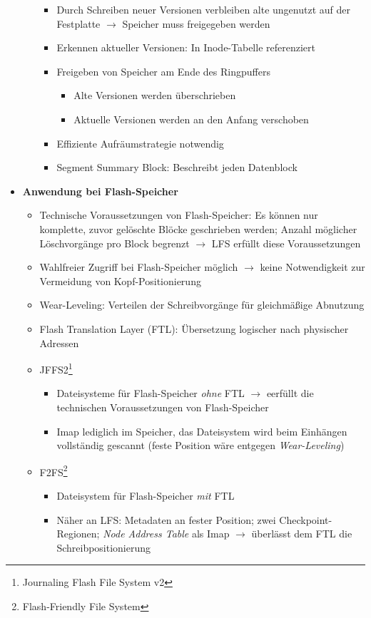 \begin{itemize}
\begin{itemize}
\begin{itemize}
			\item Durch Schreiben neuer Versionen verbleiben alte ungenutzt auf der Festplatte \(\rightarrow\) Speicher muss freigegeben werden
			\item Erkennen aktueller Versionen: In Inode-Tabelle referenziert
			\item Freigeben von Speicher am Ende des Ringpuffers
			\begin{itemize}
				\item Alte Versionen werden überschrieben
				\item Aktuelle Versionen werden an den Anfang verschoben
			\end{itemize}
			\item Effiziente Aufräumstrategie notwendig
			\item Segment Summary Block: Beschreibt jeden Datenblock
		\end{itemize}
	\end{itemize}
	\item \textbf{Anwendung bei Flash-Speicher}
	\begin{itemize}
		\item Technische Voraussetzungen von Flash-Speicher: Es können nur komplette, zuvor gelöschte Blöcke geschrieben werden; Anzahl möglicher Löschvorgänge pro Block begrenzt \(\rightarrow\) LFS erfüllt diese Voraussetzungen
		\item Wahlfreier Zugriff bei Flash-Speicher möglich \(\rightarrow\) keine Notwendigkeit zur Vermeidung von Kopf-Positionierung
		\item Wear-Leveling: Verteilen der Schreibvorgänge für gleichmäßige Abnutzung
		\item Flash Translation Layer (FTL): Übersetzung logischer nach physischer Adressen
		\item JFFS2\footnote{Journaling Flash File System v2}
		\begin{itemize}
			\item Dateisysteme für Flash-Speicher \textit{ohne} FTL \(\rightarrow\) eerfüllt die technischen Voraussetzungen von Flash-Speicher
			\item Imap lediglich im Speicher, das Dateisystem wird beim Einhängen vollständig gescannt (feste Position wäre entgegen \textit{Wear-Leveling})
		\end{itemize}
		\item F2FS\footnote{Flash-Friendly File System}
		\begin{itemize}
			\item Dateisystem für Flash-Speicher \textit{mit} FTL
			\item Näher an LFS: Metadaten an fester Position; zwei Checkpoint-Regionen; \textit{Node Address Table} als Imap \(\rightarrow\) überlässt dem FTL die Schreibpositionierung
		\end{itemize}
	\end{itemize}
\end{itemize}

